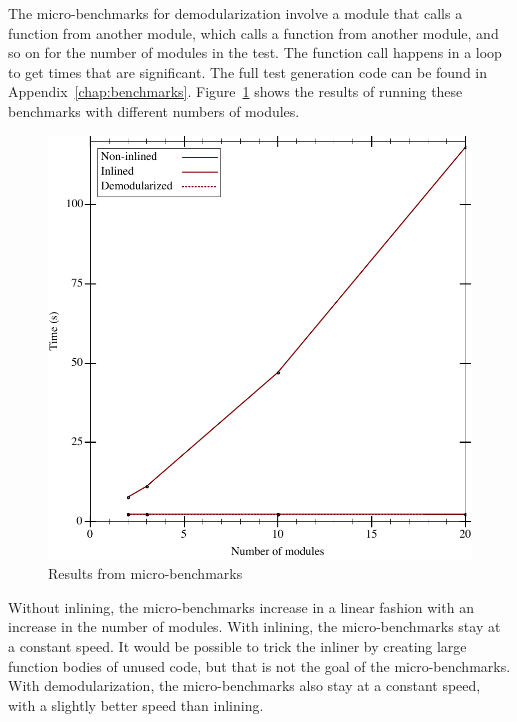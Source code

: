 The micro-benchmarks for demodularization involve a module that calls a function from another module, which calls a function from another module, and so on for the number of modules in the test. 
The function call happens in a loop to get times that are significant.
The full test generation code can be found in Appendix~\ref{chap:benchmarks}.
Figure~\ref{fig:micro-results} shows the results of running these benchmarks with different numbers of modules.
\begin{figure}
\includegraphics{figures/micro-results}
\caption{Results from micro-benchmarks}
\label{fig:micro-results}
\end{figure}
Without inlining, the micro-benchmarks increase in a linear fashion with an increase in the number of modules.
With inlining, the micro-benchmarks stay at a constant speed.
It would be possible to trick the inliner by creating large function bodies of unused code, but that is not the goal of the micro-benchmarks.
With demodularization, the micro-benchmarks also stay at a constant speed, with a slightly better speed than inlining.


